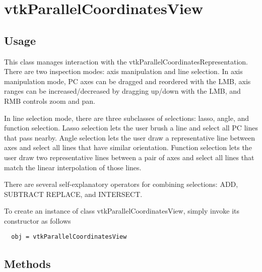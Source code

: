 \section{vtkParallelCoordinatesView}

\subsection{Usage}


 This class manages interaction with the vtkParallelCoordinatesRepresentation.  There are 
 two inspection modes: axis manipulation and line selection.  In axis manipulation mode,
 PC axes can be dragged and reordered with the LMB, axis ranges can be increased/decreased
 by dragging up/down with the LMB, and RMB controls zoom and pan.  
 
 In line selection mode, there are three subclasses of selections: lasso, angle, and 
 function selection.  Lasso selection lets the user brush a line and select all PC lines 
 that pass nearby.  Angle selection lets the user draw a representative line between axes 
 and select all lines that have similar orientation.  Function selection lets the user 
 draw two  representative lines between a pair of axes and select all lines that match
 the linear interpolation of those lines.  

 There are several self-explanatory operators for combining selections: ADD, SUBTRACT
 REPLACE, and INTERSECT.  

To create an instance of class vtkParallelCoordinatesView, simply
invoke its constructor as follows
\begin{verbatim}
  obj = vtkParallelCoordinatesView
\end{verbatim}
\subsection{Methods}

